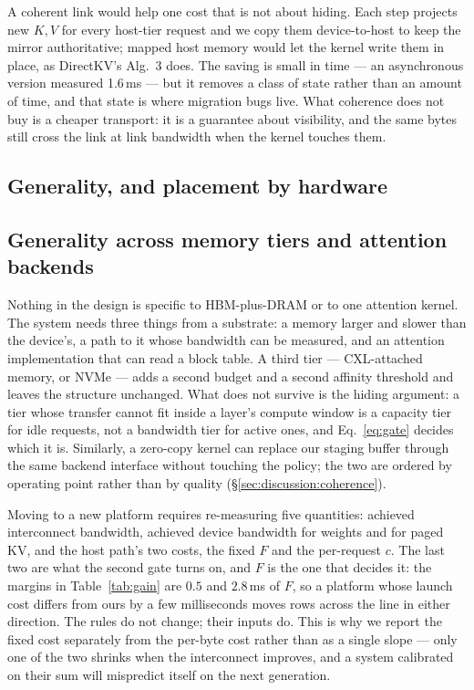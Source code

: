 A coherent link would help one cost that is not about hiding. Each step projects
new $K,V$ for every host-tier request and we copy them device-to-host to keep the
mirror authoritative; mapped host memory would let the kernel write them in
place, as DirectKV's Alg.~3 does. The saving is small in time --- an asynchronous
version measured 1.6\,ms --- but it removes a class of state rather than an
amount of time, and that state is where migration bugs live. What coherence does
not buy is a cheaper transport: it is a guarantee about visibility, and the same
bytes still cross the link at link bandwidth when the kernel touches them.



\subsection*{Generality, and placement by hardware}

\subsection{Generality across memory tiers and attention backends}

Nothing in the design is specific to HBM-plus-DRAM or to one attention kernel.
The system needs three things from a substrate: a memory larger and slower than
the device's, a path to it whose bandwidth can be measured, and an attention
implementation that can read a block table. A third tier --- CXL-attached
memory, or NVMe --- adds a second budget and a second affinity threshold and
leaves the structure unchanged. What does not survive is the hiding argument: a
tier whose transfer cannot fit inside a layer's compute window is a capacity
tier for idle requests, not a bandwidth tier for active ones, and
Eq.~\ref{eq:gate} decides which it is. Similarly, a zero-copy kernel can replace
our staging buffer through the same backend interface without touching the
policy; the two are ordered by operating point rather than by quality
(\S\ref{sec:discussion:coherence}).

Moving to a new platform requires re-measuring five quantities: achieved
interconnect bandwidth, achieved device bandwidth for weights and for paged KV,
and the host path's two costs, the fixed $F$ and the per-request $c$. The last
two are what the second gate turns on, and $F$ is the one that decides it: the
margins in Table~\ref{tab:gain} are $0.5$ and $2.8$\,ms of $F$, so a platform
whose launch cost differs from ours by a few milliseconds moves rows across the
line in either direction. The rules do not change; their inputs do. This is
why we report the fixed cost separately from the per-byte cost rather than as a
single slope --- only one of the two shrinks when the interconnect improves, and
a system calibrated on their sum will mispredict itself on the next generation.

